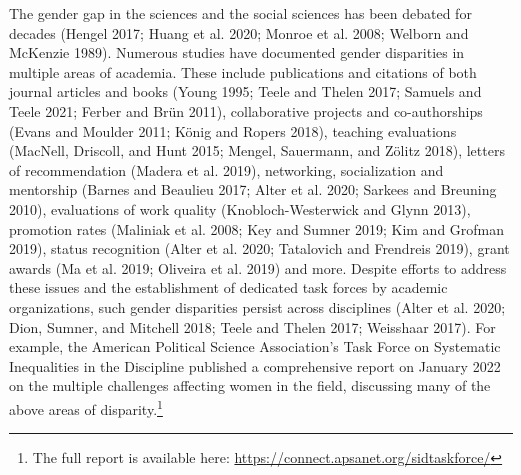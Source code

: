 \documentclass[
]{ccr}
\begin{document}
The gender gap in the sciences and the social sciences has been debated
for decades (Hengel 2017; Huang et al. 2020; Monroe et al. 2008; Welborn
and McKenzie 1989). Numerous studies have documented gender disparities
in multiple areas of academia. These include publications and citations
of both journal articles and books (Young 1995; Teele and Thelen 2017;
Samuels and Teele 2021; Ferber and Brün 2011), collaborative projects
and co-authorships (Evans and Moulder 2011; König and Ropers 2018),
teaching evaluations (MacNell, Driscoll, and Hunt 2015; Mengel,
Sauermann, and Zölitz 2018), letters of recommendation (Madera et al.
2019), networking, socialization and mentorship (Barnes and Beaulieu
2017; Alter et al. 2020; Sarkees and Breuning 2010), evaluations of work
quality (Knobloch-Westerwick and Glynn 2013), promotion rates (Maliniak
et al. 2008; Key and Sumner 2019; Kim and Grofman 2019), status
recognition (Alter et al. 2020; Tatalovich and Frendreis 2019), grant
awards (Ma et al. 2019; Oliveira et al. 2019) and more. Despite efforts
to address these issues and the establishment of dedicated task forces
by academic organizations, such gender disparities persist across
disciplines (Alter et al. 2020; Dion, Sumner, and Mitchell 2018; Teele
and Thelen 2017; Weisshaar 2017). For example, the American Political
Science Association's Task Force on Systematic Inequalities in the
Discipline published a comprehensive report on January 2022 on the
multiple challenges affecting women in the field, discussing many of the
above areas of disparity.\footnote{The full report is available here:
  \url{https://connect.apsanet.org/sidtaskforce/}}
\end{document}
